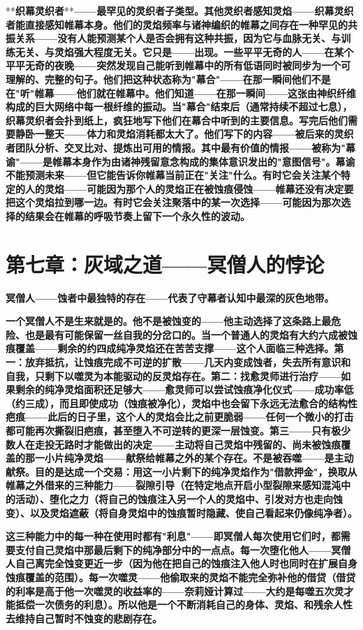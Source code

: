 \documentclass[12pt,a4paper,openany]{ctexbook}
\begin{document}
**\textbf{织幕灵织者}**\textbf{——最罕见的灵织者子类型。其他灵织者感知灵焰——织幕灵织者能直接感知帷幕本身。他们的灵焰频率与诸神编织的帷幕之间存在一种罕见的共振关系——没有人能预测某个人是否会拥有这种共振，因为它与血脉无关、与训练无关、与灵焰强大程度无关。它只是——出现。一些平平无奇的人——在某个平平无奇的夜晚——突然发现自己能听到帷幕中的所有低语同时被同步为一个可理解的、完整的句子。他们把这种状态称为"幕合"——在那一瞬间他们不是在"听"帷幕——他们就在帷幕中。他们知道——在那一瞬间——这张由神织纤维构成的巨大网络中每一根纤维的振动。当"幕合"结束后（通常持续不超过七息），织幕灵织者会扑到纸上，疯狂地写下他们在幕合中听到的主要信息。写完后他们需要静卧一整天——体力和灵焰消耗都太大了。他们写下的内容——被后来的灵织者团队分析、交叉比对、提炼出可用的情报。其中最有价值的情报——被称为"幕谕"——是帷幕本身作为由诸神残留意念构成的集体意识发出的"意图信号"。幕谕不能预测未来——但它能告诉你帷幕当前正在"关注"什么。有时它会关注某个特定的人的灵焰——可能因为那个人的灵焰正在被蚀痕侵蚀——帷幕还没有决定要把这个灵焰拉到哪一边。有时它会关注聚落中的某一次选择——可能因为那次选择的结果会在帷幕的呼吸节奏上留下一个永久性的波动。}


\section*{第七章：灰域之道——冥僧人的悖论}


\textbf{冥僧人——蚀者中最独特的存在——代表了守幕者认知中最深的灰色地带。}


\textbf{一个冥僧人不是生来就是的。他不是被蚀变的——他主动选择了这条路上最危险、也是最有可能保留一丝自我的分岔口的。当一个普通人的灵焰有大约六成被蚀痕覆盖——剩余的约四成纯净灵焰还在苦苦支撑——这个人面临三种选择。第一：放弃抵抗，让蚀痕完成不可逆的扩散——几天内变成蚀者，失去所有意识和自我，只剩下以噬灵为本能驱动的反灵焰存在。第二：找愈灵师进行治疗——如果剩余的纯净灵焰面积还足够大——愈灵师可以尝试蚀痕净化仪式——成功率低（约三成），而且即使成功（蚀痕被净化），灵焰中也会留下永远无法愈合的结构性疤痕——此后的日子里，这个人的灵焰会比之前更脆弱——任何一个微小的打击都可能再次撕裂旧疤痕，甚至堕入不可逆转的更深一层蚀变。第三——只有极少数人在走投无路时才能做出的决定——主动将自己灵焰中残留的、尚未被蚀痕覆盖的那一小片纯净灵焰——献祭给帷幕之外的某个存在。不是被吞噬——是主动献祭。目的是达成一个交易：用这一小片剩下的纯净灵焰作为"借款押金"，换取从帷幕之外借来的三种能力——裂隙引导（在特定地点开启小型裂隙来感知混沌中的活动）、堕化之力（将自己的蚀痕注入另一个人的灵焰中、引发对方也走向蚀变）、以及灵焰遮蔽（将自身灵焰中的蚀痕暂时隐藏、使自己看起来仍像纯净者）。}


\textbf{这三种能力中的每一种在使用时都有"利息"——即冥僧人每次使用它们时，都需要支付自己灵焰中那最后剩下的纯净部分中的一点点。每一次堕化他人——冥僧人自己离完全蚀变更近一步（因为他在把自己的蚀痕注入他人时也同时在扩展自身蚀痕覆盖的范围）。每一次噬灵——他偷取来的灵焰不能完全弥补他的借贷（借贷的利率是高于他一次噬灵的收益率的——奈莉娅计算过——大约是每噬五次灵才能抵偿一次债务的利息）。所以他是一个不断消耗自己的身体、灵焰、和残余人性去维持自己暂时不蚀变的悲剧存在。}
\end{document}

